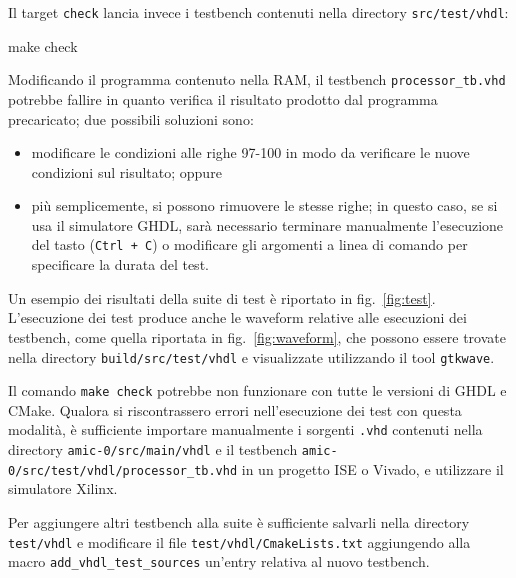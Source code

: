 \documentclass[a4paper,12pt]{scrreprt}
\begin{document}
Il target \lstinline{check} lancia invece i testbench contenuti nella directory
\lstinline{src/test/vhdl}:
\begin{commandshell}
  make check
\end{commandshell}

\begin{warningbox}{}{}
  Modificando il programma contenuto nella RAM, il testbench
  \lstinline{processor_tb.vhd} potrebbe fallire in quanto verifica il risultato
  prodotto dal programma precaricato; due possibili soluzioni sono:
  \begin{itemize}
    \item modificare le condizioni alle righe 97-100 in modo da verificare le
    nuove condizioni sul risultato; oppure
    \item più semplicemente, si possono rimuovere le stesse righe; in questo
    caso, se si usa il simulatore GHDL, sarà necessario terminare manualmente
    l'esecuzione del tasto (\lstinline{Ctrl + C}) o modificare gli argomenti a
    linea di comando per specificare la durata del test.
  \end{itemize}
\end{warningbox}

Un esempio dei risultati della suite di test è riportato in
fig.~\ref{fig:test}. L'esecuzione dei test produce anche le waveform relative
alle esecuzioni dei testbench, come quella riportata in fig.~\ref{fig:waveform},
che possono essere trovate nella directory \lstinline{build/src/test/vhdl} e
visualizzate utilizzando il tool \lstinline{gtkwave}.

\begin{warningbox}{}{}
  Il comando \lstinline{make check} potrebbe non funzionare con tutte le
  versioni di GHDL e CMake. Qualora si riscontrassero errori nell'esecuzione dei
  test con questa modalità, è sufficiente importare manualmente i sorgenti
  \lstinline{.vhd} contenuti nella directory \lstinline{amic-0/src/main/vhdl} e
  il testbench \lstinline{amic-0/src/test/vhdl/processor_tb.vhd} in un progetto
  ISE o Vivado, e utilizzare il simulatore Xilinx.
\end{warningbox}

Per aggiungere altri testbench alla suite è sufficiente salvarli nella
directory \lstinline{test/vhdl} e modificare il file
\lstinline{test/vhdl/CmakeLists.txt} aggiungendo alla macro
\lstinline{add_vhdl_test_sources} un'entry relativa al nuovo testbench.
\end{document}
